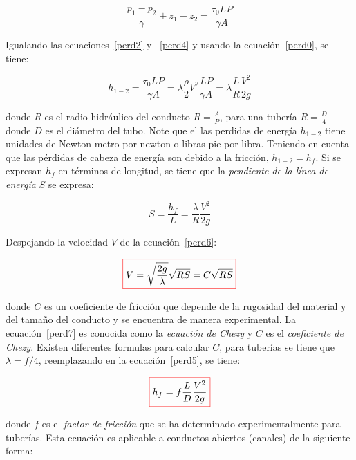 \documentclass[11pt, oneside]{article}
\begin{document}
\begin{equation}
\frac{p_1 - p_2}{\gamma} + z_1 - z_2 = \frac{\tau_0 L P}{\gamma A}
\label{perd4}
\end{equation}

Igualando las ecuaciones~\ref{perd2} y ~\ref{perd4} y usando la ecuaci\'on~\ref{perd0}, se tiene:

\begin{equation}
h_{1-2} = \frac{\tau_0 LP}{\gamma A} = \lambda \frac{\rho}{2}V^2 \frac{LP}{\gamma A} =\lambda \frac{L}{R} \frac{V^2}{2g}
\label{perd5}
\end{equation}

donde $R$ es el radio hidr\'aulico del conducto $R = \frac{A}{P}$, para una tuber\'ia $R= \frac{D}{4}$ donde $D$ es el di\'ametro del tubo. Note que el las perdidas de energ\'ia $h_{1-2}$ tiene unidades de Newton-metro por newton o libras-pie por libra. Teniendo en cuenta que las p\'erdidas de cabeza de energ\'ia son debido a la fricci\'on, $h_{1-2} = h_f$. Si se expresan $h_f$ en t\'erminos de longitud, se tiene que la \emph{pendiente de la l\'inea de energ\'ia} $S$ se expresa:

\begin{equation}
S = \frac{h_f}{L} = \frac{\lambda}{R}\frac{V^2}{2g} 
\label{perd6}
\end{equation}

Despejando la velocidad $V$ de la ecuaci\'on~\ref{perd6}:

\begin{equation}
\color{red}\boxed{\color{black} V = \sqrt{\frac{2g}{\lambda}}\sqrt{RS} = C \sqrt{RS} }
\label{perd7}
\end{equation}

donde $C$ es un coeficiente de fricci\'on que depende de la rugosidad del material y del tama\~no del conducto y se encuentra de manera experimental. La ecuaci\'on~\ref{perd7} es conocida como la \emph{ecuaci\'on de Chezy} y $C$ es el \emph{coeficiente de Chezy}. Existen diferentes formulas para calcular $C$, para tuber\'ias se tiene que $\lambda = f/4$, reemplazando en la ecuaci\'on~\ref{perd5}, se tiene:

\begin{equation}
\color{red}\boxed{\color{black} h_f = f \frac{L}{D} \frac{V^2}{2g}}
\label{perd8}
\end{equation}

donde $f$ es el \emph{factor de fricci\'on} que se ha determinado experimentalmente para tuber\'ias. Esta ecuaci\'on es aplicable a conductos abiertos (canales) de la siguiente forma:
\end{document}
